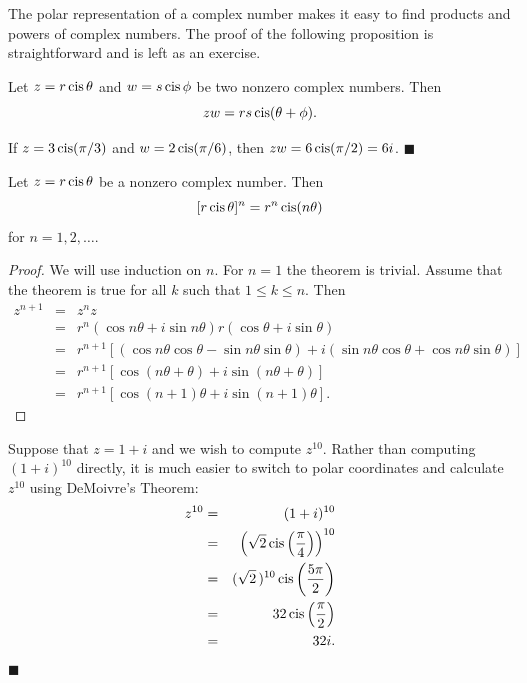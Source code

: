  
\vspace{ 2ex }
 
 
The polar representation of a complex number makes it easy to find
products and powers of complex numbers.  The proof of the following
proposition is straightforward and is left as an exercise.
 
 
\begin{proposition}
Let $z = r \operatorname{cis} \theta$ and $w = s \operatorname{cis} \phi$
be two nonzero complex numbers. Then 
$$
zw = r s \operatorname{cis}( \theta + \phi).
$$
\end{proposition}
 
 
If $z =  3 \operatorname{cis}( \pi / 3 )$ and $w = 2 \operatorname{cis}(\pi / 6 )$, then $zw = 6
\operatorname{cis}( \pi / 2 ) = 6i$.  
\hspace{\fill} $\blacksquare$
 
 
\begin{theorem}[DeMoivre]
Let $z = r \operatorname{cis}  \theta$ be a nonzero complex number. Then 
$$
[r \operatorname{cis} \theta  ]^n
=
r^n \operatorname{cis}( n \theta)
$$
for $n = 1, 2, \ldots$.
\end{theorem}
 
 
\begin{proof}
We will use induction on $n$. For $n = 1$ the theorem is trivial.
Assume that the theorem is true for all $k$ such that $1  \leq k \leq
n$. Then 
\begin{eqnarray*}
z^{n+1} & = & z^n z \\
& = &
r^n( \cos  n \theta + i \sin n \theta ) r( \cos \theta + i
\sin \theta ) \\
& = &
r^{n+1} [( \cos n \theta \cos \theta - \sin n \theta \sin
\theta )
 + i ( \sin n \theta \cos \theta + \cos n \theta \sin \theta
)] \\
& = &
r^{n+1} [ \cos( n \theta + \theta) + i \sin( n \theta +
\theta) ] \\
& = &
r^{n+1} [ \cos( n +1) \theta + i \sin( n+1) \theta  ].
\end{eqnarray*}
\end{proof}
 
 
\vspace{2ex}
 
 
Suppose that $z= 1+i$ and we wish to compute $z^{10}$. Rather than
computing $(1+i)^{10}$ directly, it is much easier to switch to polar
coordinates and calculate $z^{10}$ using DeMoivre's Theorem:
\begin{eqnarray*}
z^{10}
& = &
(1+i)^{10} \\
& = &
\left( \sqrt{2} \operatorname{cis} \left( \frac{\pi }{4} \right)
\right)^{10} \\
& = &
( \sqrt{2}\, )^{10} \operatorname{cis} \left( \frac{5\pi }{2} \right)
\\
& = &
32  \operatorname{cis} \left( \frac{\pi }{2} \right) \\
& = & 32i.
\end{eqnarray*}
\hspace{\fill} $\blacksquare$
 

